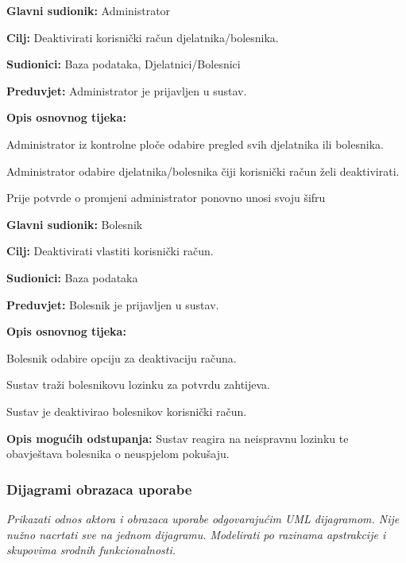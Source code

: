 	\item \textbf{Glavni sudionik:} Administrator
	\item \textbf{Cilj:} Deaktivirati korisnički račun djelatnika/bolesnika.
	\item \textbf{Sudionici:} Baza podataka, Djelatnici/Bolesnici
	\item \textbf{Preduvjet:} Administrator je prijavljen u sustav.
	\item \textbf{Opis osnovnog tijeka:}
	\begin{packed_enum}
		\item Administrator iz kontrolne ploče odabire pregled svih djelatnika ili bolesnika.
		\item Administrator odabire djelatnika/bolesnika čiji korisnički račun želi deaktivirati.
        \item Prije potvrde o promjeni administrator ponovno unosi svoju šifru
	\end{packed_enum}
\closeusecase

	\item \textbf{Glavni sudionik:} Bolesnik
	\item \textbf{Cilj:} Deaktivirati vlastiti korisnički račun.
	\item \textbf{Sudionici:} Baza podataka
	\item \textbf{Preduvjet:} Bolesnik je prijavljen u sustav.
	\item \textbf{Opis osnovnog tijeka:}
	\begin{packed_enum}
		\item Bolesnik odabire opciju za deaktivaciju računa.
		\item Sustav traži bolesnikovu lozinku za potvrdu zahtijeva.
		\item Sustav je deaktivirao bolesnikov korisnički račun.
	\end{packed_enum}
	\item \textbf{Opis mogućih odstupanja:}
	Sustav reagira na neispravnu lozinku te obavještava bolesnika o neuspjelom pokušaju.
\closeusecase


\subsubsection{Dijagrami obrazaca uporabe}

\textit{Prikazati odnos aktora i obrazaca uporabe odgovarajućim UML dijagramom. Nije nužno nacrtati sve na jednom dijagramu. Modelirati po razinama apstrakcije i skupovima srodnih funkcionalnosti.}
\eject


